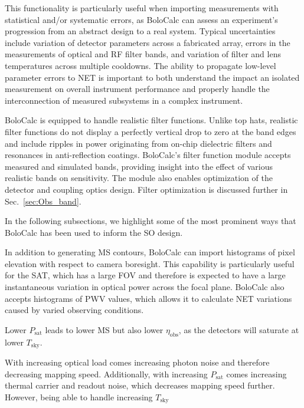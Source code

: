 This functionality is particularly useful when importing measurements with statistical and/or systematic errors, as BoloCalc can assess an experiment's progression from an abstract design to a real system. Typical uncertainties include variation of detector parameters across a fabricated array, errors in the measurements of optical and RF filter bands, and variation of filter and lens temperatures across multiple cooldowns. The ability to propagate low-level parameter errors to NET is important to both understand the impact an isolated measurement on overall instrument performance and properly handle the interconnection of measured subsystems in a complex instrument.

BoloCalc is equipped to handle realistic filter functions. Unlike top hats, realistic filter functions do not display a perfectly vertical drop to zero at the band edges and include ripples in power originating from on-chip dielectric filters and resonances in anti-reflection coatings. BoloCalc's filter function module accepts measured and simulated bands, providing insight into the effect of various realistic bands on sensitivity. The module also enables optimization of the detector and coupling optics design. Filter optimization is discussed further in Sec.~\ref{sec:Obs_band}.

In the following subsections, we highlight some of the most prominent ways that BoloCalc has been used to inform the SO design.

In addition to generating MS contours, BoloCalc can import histograms of pixel elevation with respect to camera boresight. This capability is particularly useful for the SAT, which has a large FOV and therefore is expected to have a large instantaneous variation in optical power across the focal plane. BoloCalc also accepts histograms of PWV values, which allows it to calculate NET variations caused by varied observing conditions.

Lower $P_{\mathrm{sat}}$ leads to lower MS but also lower $\eta_{\mathrm{obs}}$, as the detectors will saturate at lower $T_{\mathrm{sky}}$.  

With increasing optical load comes increasing photon noise and therefore decreasing mapping speed. Additionally, with increasing $P_{\mathrm{sat}}$ comes increasing thermal carrier and readout noise, which decreases mapping speed further. However, being able to handle increasing $T_{\mathrm{sky}}$

